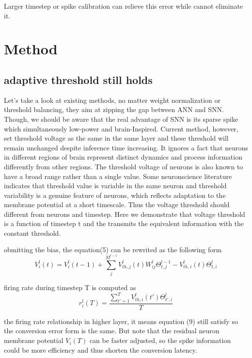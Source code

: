 \documentclass{article}
\begin{document}
Larger timestep or spike calibration can relieve this error while cannot eliminate it. 

\section{Method}
\subsection{adaptive threshold still holds}
Let's take a look at existing methods, no matter weight normalization or threshold balancing, they aim at zipping the gap between ANN and SNN. Though, we should be aware that
the real advantage of SNN is its sparse spike which simultaneously low-power and brain-Inspired. Current method, however, set threshold voltage as the same in the same layer and 
these threshold will remain unchanged despite inference time increasing. It ignores a fact that neurons in different
regions of brain represent distinct dynamics and process information differently from other regions. 
The threshold voltage of neurons is also known to have a broad
range rather than a single value. Some neuronscience literature indicates that threshold value 
is variable in the same neuron and threshold 
variability is a genuine feature of neurons, which reflects 
adaptation to the membrane potential at a short 
timescale. Thus the voltage threshold should different from neurons and timestep. Here we demonstrate that voltage threshold is a function of timestep t and the transmits the equivalent information with the constant threshold.

obmitting the bias, the equation(5) can be rewrited as the following form
\begin{equation}
  V_i^l(t)=V_{i}^{l}(t-1)+\sum_j^{M^{l-1}}V_{th,j}^l(t)W_{ij}^l\Theta_{t,j}^{l-1} -V_{th,i}^l(t)\Theta_{t,i}^{l}
\end{equation}

firing rate during timestep T is computed as 
\begin{equation}
  r_i^l(T) = \frac{\sum_{t'=1}^{T}V_{th,i}^l(t')\Theta_{t',i}^{l}}{T}
\end{equation}

the firing rate relationship in higher layer, it means equation (9) still satisfy so the conversion error form is the same.
But note that the residual neuron membrane potential $V_i(T)$ can be faster adjusted, so the spike information could be more efficiency and thus shorten the conversion latency. 
\end{document}
